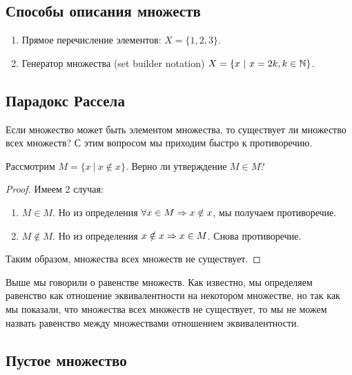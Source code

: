 \begin{multicols}{2}
    \subsection*{Способы описания множеств}
     
    \begin{enumerate}
         \item Прямое перечисление элементов: $X = \{1, 2, 3\}$.
         \item Генератор множества (set builder notation) $X = \{x\ |\ x = 2k, k \in \mathbb{N}\}$.
    \end{enumerate}
     
    \subsection*{Парадокс Рассела}
     
    Если множество может быть элементом множества, то существует ли множество всех множеств? С этим вопросом мы приходим быстро к противоречию.
     
    \begin{proposition}{}{}
        Рассмотрим $M = \{x\ |\ x \notin x\}$. Верно ли утверждение $M \in M$?
    \end{proposition}
     
    \begin{proof}
        Имеем 2 случая:
        
        \begin{enumerate}
            \item $M \in M$. Но из определения $\forall x \in M \Rightarrow x \notin x$, мы получаем противоречие.
            \item $M \notin M$. Но из определения $x \notin x \Rightarrow x \in M$. Снова противоречие.
        \end{enumerate}
        
        Таким образом, множества всех множеств не существует.
    \end{proof}
     
    \begin{note}{}{}
        Выше мы говорили о равенстве множеств. Как известно, мы определяем равенство как отношение эквивалентности на некотором множестве, но так как мы показали, что множества всех множеств не существует, то мы не можем назвать равенство между множествами отношением эквивалентности.
    \end{note}
     
    \subsection*{Пустое множество}
     

\end{multicols}

